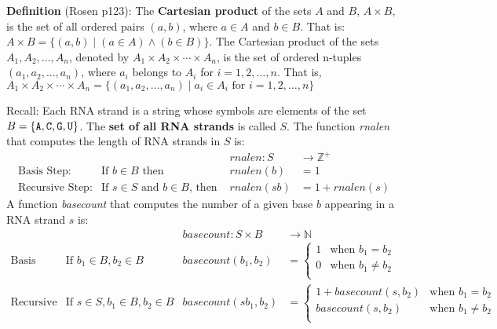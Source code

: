 \documentclass[12pt, oneside]{article}
\begin{document}
\vfill
\newpage

{\bf Definition} (Rosen p123): The {\bf Cartesian product} of the sets $A$ and $B$, $A \times B$, is the set of all ordered pairs $(a, b)$, where $a \in A$ and $b \in B$. 
That is: $A \times B = \{(a, b) \mid (a \in A) \land (b \in B)\}.$ The Cartesian product of the sets $A_1, A_2, \ldots ,A_n$, denoted by $A_1 \times A_2 \times \cdots \times A_n$, is the
set of ordered n-tuples $(a_1, a_2,...,a_n)$, where $a_i$ belongs to $A_i$ for $i = 1, 2,\ldots,n$. That is,
$A_1 \times A_2 \times \cdots \times A_n = \{(a_1, a_2,\ldots,a_n) \mid a_i \in A_i \textrm{ for } i = 1, 2,\ldots,n\}$



Recall: Each RNA strand is a string whose symbols are elements of the set $B  = \{\texttt{A}, \texttt{C}, \texttt{G}, \texttt{U} \}$.
The {\bf set of all RNA strands} is called $S$.
The function \textit{rnalen} that computes the length of RNA strands in $S$ is:
\[
\begin{array}{llll}
& & \textit{rnalen} : S & \to \mathbb{Z}^+ \\
\textrm{Basis Step:} & \textrm{If } b \in B\textrm{ then } & \textit{rnalen}(b) & = 1 \\
\textrm{Recursive Step:} & \textrm{If } s \in S\textrm{ and }b \in B\textrm{, then  } & \textit{rnalen}(sb) & = 1 + \textit{rnalen}(s)
\end{array}
\]
A function \textit{basecount} that computes the number of a given base $b$ appearing in a RNA strand $s$ is:
\[
\begin{array}{llll}
& & \textit{basecount} : S \times B & \to \mathbb{N} \\
\textrm{Basis Step:} &  \textrm{If } b_1 \in B, b_2 \in B & \textit{basecount}(b_1, b_2) & =
        \begin{cases}
            1 & \textrm{when } b_1 = b_2 \\
            0 & \textrm{when } b_1 \neq b_2 \\
        \end{cases} \\
\textrm{Recursive Step:} & \textrm{If } s \in S, b_1 \in B, b_2 \in B &\textit{basecount}(s b_1, b_2) & =
        \begin{cases}
            1 + \textit{basecount}(s, b_2) & \textrm{when } b_1 = b_2 \\
            \textit{basecount}(s, b_2) & \textrm{when } b_1 \neq b_2 \\
        \end{cases}
\end{array}
\]
\end{document}

